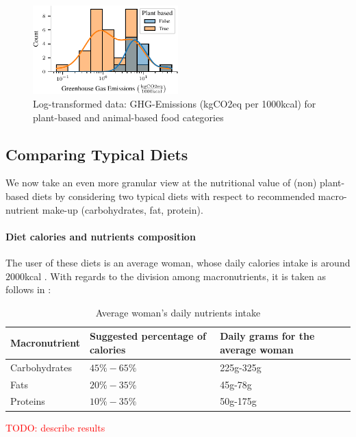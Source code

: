 \documentclass{article}
\begin{document}
\begin{figure}[h]
    \centering
    \includegraphics[width=0.5\textwidth]{figures/ghg-log.pdf}
    \caption{Log-transformed data: GHG-Emissions (kgCO2eq per 1000kcal) for plant-based and animal-based food categories}
    \label{fig:ghg-log}
\end{figure}



\subsection{Comparing Typical Diets}
We now take an even more granular view at the nutritional value of (non) plant-based diets by considering two typical diets with respect to recommended macro-nutrient make-up (carbohydrates, fat, protein).

\paragraph*{Diet calories and nutrients composition} 
The user of these diets is an average woman, whose daily calories intake is around $2000$kcal \cite{NHS}. With regards to the division among macronutrients, it is taken as follows in  \cite{Healthline}:

\begin{table} 
  \caption{Average woman's daily nutrients intake}
  \label{tbl:composition}
  \centering
  \begin{tabular}{lll}
    \toprule
    Macronutrient     & Suggested percentage of calories   & Daily grams for the average woman  \\
    \midrule
    Carbohydrates & $45\%-65\%$ &  225g-325g  \\
    Fats    & $20\%-35\% $  & 45g-78g \\
    Proteins & $10\%-35\%$ & 50g-175g \\
    \bottomrule
  \end{tabular}
\end{table}

\textcolor{red}{TODO: describe results}
\end{document}
